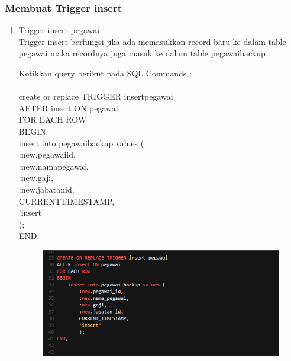 \documentclass[12pt, times new roman, a4paper]{report}
\begin{document}
\subsubsection{Membuat Trigger insert}
\begin{enumerate}
\item Trigger insert pegawai\\
Trigger insert berfungsi jika ada memasukkan record baru ke dalam table pegawai maka recordnya juga masuk ke dalam table pegawai\textunderscore backup\\
\par Ketikkan query berikut pada SQL Commands :\\
\\
create or replace TRIGGER insert\textunderscore pegawai\\
AFTER insert ON pegawai\\
FOR EACH ROW\\
BEGIN\\
    insert into pegawai\textunderscore backup values (\\
        :new.pegawai\textunderscore id,\\
        :new.nama\textunderscore pegawai,\\
        :new.gaji,\\
        :new.jabatan\textunderscore id,\\
        CURRENT\textunderscore TIMESTAMP,\\
        'insert'\\
        );\\
END;
\begin{figure}[h]
	\centering
		\includegraphics[scale=0.7]{gambar/12}
\end{figure}


\end{enumerate}
\end{document}
